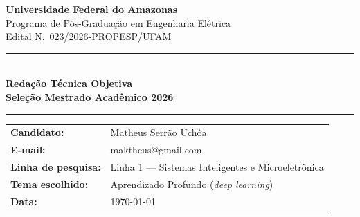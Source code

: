 \documentclass[12pt,a4paper]{article}
\begin{document}

\begin{center}
  \textcolor{ufamblue}{\Large\bfseries Universidade Federal do Amazonas}\\[3pt]
  \textcolor{ufamblue}{\large Programa de P\'os-Gradua\c{c}\~ao em Engenharia El\'etrica}\\[2pt]
  {\normalsize Edital N.\textordmasculine\ 023/2026-PROPESP/UFAM}\\[10pt]
  \rule{\linewidth}{1.5pt}\\[6pt]
  {\LARGE\bfseries Reda\c{c}\~ao T\'ecnica Objetiva}\\[4pt]
  {\large\bfseries Sele\c{c}\~ao Mestrado Acad\^emico 2026}\\[6pt]
  \rule{\linewidth}{1.5pt}
\end{center}

\vspace{6mm}

\begin{mdframed}[backgroundcolor=metabg,linecolor=ufamblue,linewidth=1pt,
                 innertopmargin=8pt,innerbottommargin=8pt,
                 innerleftmargin=10pt,innerrightmargin=10pt]
\begin{tabular}{ll}
  \textbf{Candidato:}         & Matheus Serr\~ao Uch\^oa \\[3pt]
  \textbf{E-mail:}            & maktheus@gmail.com \\[3pt]
  \textbf{Linha de pesquisa:} & Linha 1 --- Sistemas Inteligentes e Microeletr\^onica \\[3pt]
  \textbf{Tema escolhido:}    & Aprendizado Profundo (\textit{deep learning}) \\[3pt]
  \textbf{Data:}              & \today \\
\end{tabular}
\end{mdframed}

\vspace{8mm}
\end{document}
